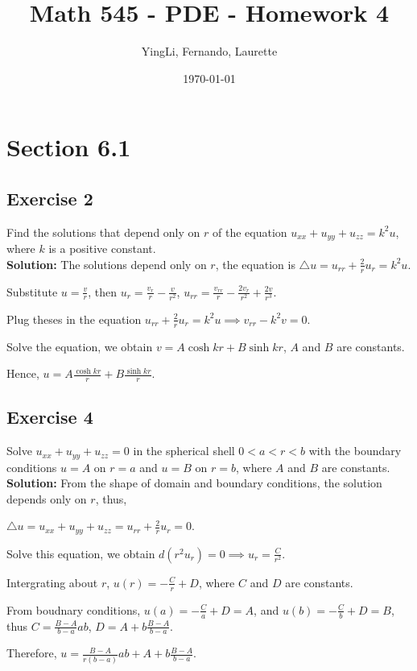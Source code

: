 \documentclass[12pt]{article}%
\begin{document}
\title{Math 545 - PDE - Homework 4}
\author{YingLi, Fernando, Laurette }
\date{\today}
\maketitle

\section*{Section 6.1}
\subsection*{Exercise 2} Find the solutions that depend only on $r$ of the equation $u_{xx}+u_{yy}+u_{zz}=k^2u$, where $k$ is a positive constant.\\
\textbf{Solution:} 
The solutions depend only on $r$, the equation is $\triangle u =u_{rr} +\frac{2}{r}u_{r}=k^2u$.

Substitute $u=\frac{v}{r}$, then $u_{r}=\frac{v_{r}}{r}-\frac{v}{r^2}$, $u_{rr}=\frac{v_{rr}}{r}-\frac{2v_{r}}{r^2}+\frac{2v}{r^3}$.

Plug theses in the equation $u_{rr}+\frac{2}{r}u_{r}=k^2u \implies v_{rr}-k^2v=0.$

Solve the equation, we obtain $v=A\cosh kr+B\sinh kr$, $A$ and $B$ are constants. 

Hence, $u=A\frac{\cosh kr}{r}+B\frac{\sinh kr}{r}$.

\subsection*{Exercise 4} Solve $u_{xx}+u_{yy}+u_{zz}=0$ in the spherical shell $0<a<r<b$ with the boundary conditions $u=A$ on $r=a$ and $u=B$ on $r=b$,
    where $A$ and $B$ are constants.\\
    \textbf{Solution:}
From the shape of domain and boundary conditions, the solution depends only on $r$, thus,

$\triangle u = u_{xx}+u_{yy}+u_{zz}= u_{rr} +\frac{2}{r}u_{r}=0$.

Solve this equation, we obtain $d(r^2u_{r})=0 \implies u_{r}=\frac{C}{r^2}$.

Intergrating about $r$, $u(r)=-\frac{C}{r}+D$, where $C$ and $D$ are constants.

From boudnary conditions, $u(a)=-\frac{C}{a}+D=A$, and $u(b)=-\frac{C}{b}+D=B$, thus $C=\frac{B-A}{b-a}ab$, $D=A+b\frac{B-A}{b-a}$.

Therefore, $u=\frac{B-A}{r(b-a)}ab+A+b\frac{B-A}{b-a}.$
\end{document}
